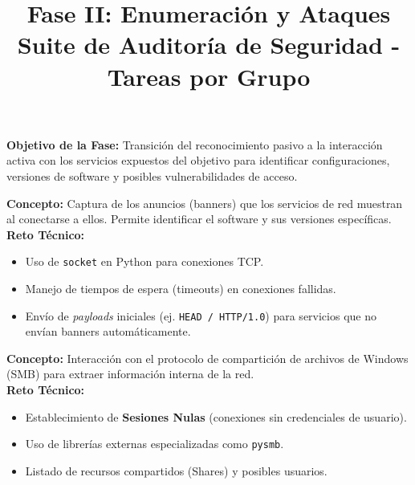 \documentclass[12pt,a4paper]{article}
\title{\vspace{-2cm}\textbf{\Huge \color{primary}Fase II: Enumeración y Ataques}\\\vspace{0.5cm}\large \textbf{Suite de Auditoría de Seguridad - Tareas por Grupo}}
\author{}
\date{}
\begin{document}
\maketitle
\vspace{-2cm}

\begin{tcolorbox}[colframe=primary, colback=primary!5, arc=2mm, boxrule=1pt]
\textbf{Objetivo de la Fase:} Transición del reconocimiento pasivo a la interacción activa con los servicios expuestos del objetivo para identificar configuraciones, versiones de software y posibles vulnerabilidades de acceso.
\end{tcolorbox}

\vspace{0.5cm}

\begin{tcolorbox}[colframe=group1, colback=group1!5, title=\textbf{Grupo 1: Banner Grabbing (\texttt{banner\_grabber.py})}, arc=2mm, fonttitle=\bfseries]
\textbf{Concepto:} Captura de los anuncios (banners) que los servicios de red muestran al conectarse a ellos. Permite identificar el software y sus versiones específicas.\\
\textbf{Reto Técnico:} 
\begin{itemize}
    \item Uso de \texttt{socket} en Python para conexiones TCP.
    \item Manejo de tiempos de espera (timeouts) en conexiones fallidas.
    \item Envío de \textit{payloads} iniciales (ej. \texttt{HEAD / HTTP/1.0}) para servicios que no envían banners automáticamente.
\end{itemize}
\end{tcolorbox}

\begin{tcolorbox}[colframe=group2, colback=group2!5, title=\textbf{Grupo 2: Enumeración NetBIOS/SMB (\texttt{smb\_enumerator.py})}, arc=2mm, fonttitle=\bfseries]
\textbf{Concepto:} Interacción con el protocolo de compartición de archivos de Windows (SMB) para extraer información interna de la red.\\
\textbf{Reto Técnico:}
\begin{itemize}
    \item Establecimiento de \textbf{Sesiones Nulas} (conexiones sin credenciales de usuario).
    \item Uso de librerías externas especializadas como \texttt{pysmb}.
    \item Listado de recursos compartidos (Shares) y posibles usuarios.
\end{itemize}
\end{tcolorbox}
\end{document}
